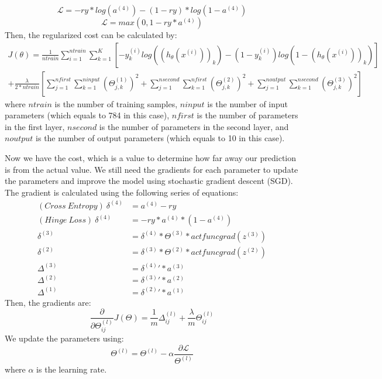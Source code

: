 \documentclass[UTF8,12pt]{article}
\begin{document}
	\begin{equation}
	\label{eq:crossentropy}
	\mathcal{L}  = -ry*log(a^{(4)})-(1-ry)*log(1-a^{(4)})
	\end{equation}
	\begin{equation}
	\label{eq:hingeloss}
	\mathcal{L}  = max(0,1-ry*a^{(4)})
	\end{equation}
	Then, the regularized cost can be calculated by:
	\begin{align}
	J(\theta) = \frac{1}{ntrain}\sum_{i=1}^{ntrain}\sum_{k=1}^{K}\left [ -y_{k}^{(i)}log((h_{\theta}(x^{(i)}))_{k})-(1-y_{k}^{(i)})log(1-(h_{\theta}(x^{(i)}))_{k}) \right ]\nonumber\\+\frac{\lambda}{2*ntrain}\left [ \sum_{j=1}^{nfirst}\sum_{k=1}^{ninput}(\Theta_{j,k}^{(1)})^{2}+\sum_{j=1}^{nsecond}\sum_{k=1}^{nfirst}(\Theta_{j,k}^{(2)})^{2} +\sum_{j=1}^{noutput}\sum_{k=1}^{nsecond}(\Theta_{j,k}^{(3)})^{2}\right ]
	\end{align}
	where $ntrain$ is the number of training samples, $ninput$ is the number of input parameters (which equals to 784 in this case), $nfirst$ is the number of parameters in the first layer, $nsecond$ is the number of parameters in the second layer, and $noutput$ is the number of output parameters (which equals to 10 in this case).
	
	Now we have the cost, which is a value to determine how far away our prediction is from the actual value. We still need the gradients for each parameter to update the parameters and improve the model using stochastic gradient descent (SGD). The gradient is calculated using the following series of equations:
	\begin{align}
	(Cross \ Entropy) \ \delta^{(4)} &= a^{(4)}-ry\\(Hinge \ Loss) \ \delta^{(4)} &= -ry*a^{(4)}*(1-a^{(4)})\\
	\delta^{(3)}&=\delta^{(4)}*\Theta^{(3)}*actfuncgrad(z^{(3)})\\
	\delta^{(2)}&=\delta^{(3)}*\Theta^{(2)}*actfuncgrad(z^{(2)})\\
	\Delta^{(3)} &= \delta^{(4)}{'}*a^{(3)}\\
	\Delta^{(2)} &= \delta^{(3)}{'}*a^{(2)}\\
	\Delta^{(1)} &= \delta^{(2)}{'}*a^{(1)}
	\end{align}
	Then, the gradients are:
	\begin{equation}
	\frac{\partial }{\partial \Theta_{ij}^{(l)}}J(\Theta) = \frac{1}{m}\Delta_{ij}^{(l)}+\frac{\lambda}{m}\Theta_{ij}^{(l)}
	\end{equation}
	We update the parameters using:
	\begin{equation}
	\Theta^{(l)} = \Theta^{(l)}-\alpha\frac{\partial \mathcal{L} }{\Theta^{(l)}}
	\end{equation}
	where $\alpha$ is the learning rate.
	
\end{document}
